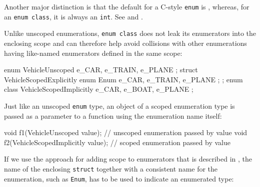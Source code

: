 \noindent Another major distinction is that the default
 for a C-style \lstinline!enum! is
, whereas, for an
\lstinline!enum!~\lstinline!class!, it is always an \lstinline!int!. See  and . 

%

\noindent Unlike unscoped enumerations, \lstinline!enum!~\lstinline!class! does not leak
its enumerators into the enclosing scope and can therefore help avoid
collisions with other enumerations having like-named enumerators defined
in the same scope:

\begin{emcppslisting}[emcppsbatch=e3]
enum       VehicleUnscoped  { e_CAR, e_TRAIN, e_PLANE };
struct     VehicleScopedExplicitly { enum Enum { e_CAR, e_TRAIN, e_PLANE }; };
enum class VehicleScopedImplicitly { e_CAR, e_BOAT, e_PLANE };
\end{emcppslisting}

\noindent Just like an unscoped \lstinline!enum! type, an object of a scoped enumeration type is passed as a parameter to a function
using the enumeration name itself:

\begin{emcppslisting}[emcppsbatch=e3]
void f1(VehicleUnscoped value);          // unscoped enumeration passed by value
void f2(VehicleScopedImplicitly value);  // scoped enumeration passed by value
\end{emcppslisting}

If we use the approach for
adding scope to enumerators that is described in , 
the name of the enclosing \lstinline!struct! together with a
consistent name for the enumeration, such as \lstinline!Enum!, has to be used to indicate an
enumerated type:

